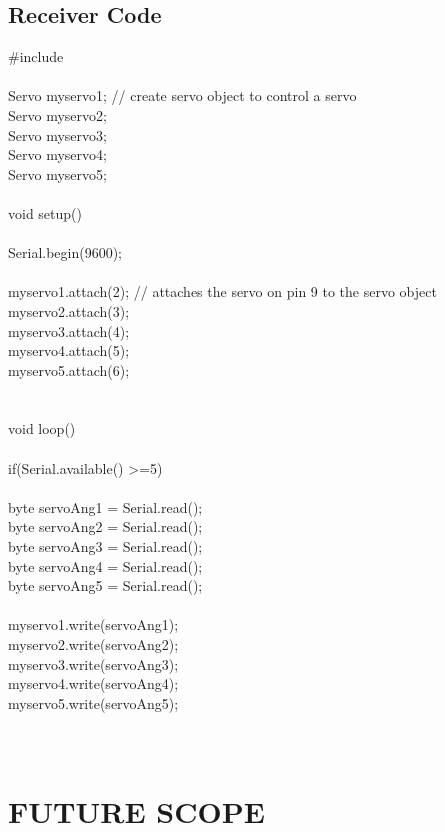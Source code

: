 \documentclass[a4paper, 12pt, notitlepage]{report}
\begin{document}
\section{Receiver Code}
#include\\
\\
Servo myservo1; // create servo object to control a servo\\
Servo myservo2;\\
Servo myservo3;\\
Servo myservo4;\\
Servo myservo5;\\
\\
void setup()\\
{\\
Serial.begin(9600);\\
\\
myservo1.attach(2); // attaches the servo on pin 9 to the servo object\\
myservo2.attach(3);\\
myservo3.attach(4);\\
myservo4.attach(5);\\
myservo5.attach(6);\\
}\\
\\
void loop()\\
{\\
if(Serial.available() \textgreater=5)\\
{\\
byte servoAng1 = Serial.read();\\
byte servoAng2 = Serial.read();\\
byte servoAng3 = Serial.read();\\
byte servoAng4 = Serial.read();\\
byte servoAng5 = Serial.read();\\
\\
myservo1.write(servoAng1);\\
myservo2.write(servoAng2);\\
myservo3.write(servoAng3);\\
myservo4.write(servoAng4);\\
myservo5.write(servoAng5);\\
}\\
}\\


\chapter{FUTURE SCOPE}
\end{document}

